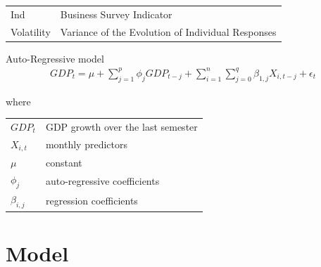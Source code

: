 \documentclass[12pt,a4paper,oneside]{book}
\begin{document}
\begin{tabular}{l l}
    Ind & Business Survey Indicator \\
    
    Volatility & Variance of the Evolution of Individual Responses \\
    
\end{tabular}

Auto-Regressive model
\begin{eqnarray}
    GDP_{t} = \mu + \sum^p_{j = 1} \phi_j GDP_{t-j} +         \sum^n_{i = 1} \sum^q_{j = 0}
       \beta_{1,j} X_{i,t-j} + \epsilon_t 
\end{eqnarray}

where   \\
\begin{tabular}{l l}
    $GDP_t$     & GDP growth over the last semester \\
    $X_{i,t}$   & monthly predictors \\
    $\mu$       & constant \\
    $\phi_j$    & auto-regressive coefficients \\
    $\beta_{i,j}$ & regression coefficients \\
\end{tabular}



\section{Model}

\newpage
\end{document}
